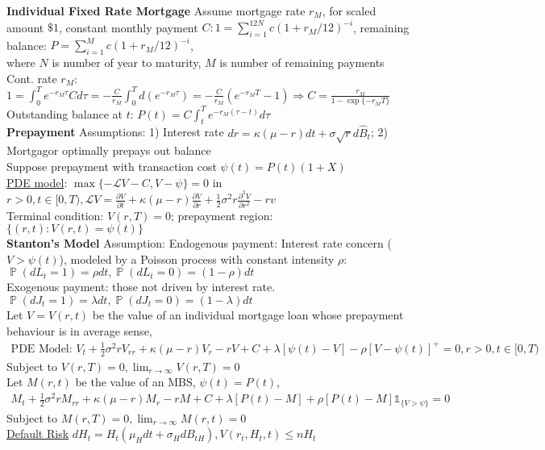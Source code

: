 \documentclass[12pt,landscape, a4paper]{article}
\theoremstyle{remark}
\newcommand{\prob}{\operatorname{\mathbb{P}}}
\newcommand{\dd}{\partial}
\begin{document}
\begin{multicols*}{3}
\textbf{Individual Fixed Rate Mortgage} Assume mortgage rate $r_M$, for scaled amount $\$1$, constant monthly payment $C: 1 = \sum^{12N}_{i=1} c (1+ r_M/12)^{-i}$, remaining balance: $P = \sum^M_{i=1} c (1+ r_M/12)^{-i}$, \\
where $N$ is number of year to maturity, $M$ is number of remaining payments\\
Cont. rate $r_M$: $1 = \int^T_0 e^{-r_M \tau} C d\tau = -\frac{C}{r_M} \int^T_0 d(e^{-r_M \tau}) = -\frac{C}{r_M} \left(e^{-r_M T}-1 \right) \Rightarrow C = \frac{r_M}{1 - \exp \{ -r_M T\}}$\\
Outstanding balance at $t$: $P(t) = C \int^T_t e^{-r_M (\tau - t)} d\tau$\\

\textbf{Prepayment} Assumptions: 1) Interest rate $dr = \kappa (\mu - r) dt + \sigma \sqrt{r} d \hat{B}_t$; 2) Mortgagor optimally prepays out balance\\
Suppose prepayment with transaction cost $\psi (t) = P(t) (1+X)$\\
\underline{PDE model}: $\max \{-\mathcal{L}V - C, V -\psi \} = 0$ in $r >0, t \in[0, T), \mathcal{L}V = \frac{\dd V}{\dd t} + \kappa (\mu - r)\frac{\dd V}{\dd r} + \frac{1}{2} \sigma^2 r \frac{\dd^2 V}{\dd r^2} - rv$\\
Terminal condition: $V(r, T) = 0$; prepayment region: $\{(r, t): V(r, t) = \psi (t) \}$\\

\textbf{Stanton's Model} Assumption: Endogenous payment: Interest rate concern ($V > \psi (t)$), modeled by a Poisson process with constant intensity $\rho$: $\prob(d L_t = 1) = \rho dt, \prob(d L_t = 0) = (1-\rho) dt$\\
Exogenous payment: those not driven by interest rate. $\prob (d J_t = 1) = \lambda dt, \prob (d J_t = 0) = (1-\lambda) dt$\\
Let $V = V(r, t)$ be the value of an individual mortgage loan whose prepayment behaviour is in average sense,
\begin{align*}
    \text{PDE Model: }V_t + \frac{1}{2} \sigma^2 r V_{rr} + \kappa (\mu - r) V_r - rV + C + \lambda [\psi (t) - V] - \rho [V - \psi (t)]^+ = 0, r>0, t\in [0, T) 
\end{align*}
Subject to $V(r, T) = 0, \lim_{r\to \infty} V(r, T) = 0$\\
Let $M(r, t)$ be the value of an MBS, $\psi (t) = P(t)$,
\begin{align*}
    M_t + \frac{1}{2} \sigma^2 rM_{rr} + \kappa (\mu - r) M_r - rM + C + \lambda [P(t) - M]+ \rho [P(t) - M]\mathds{1}_{\{V>\psi\}} = 0
\end{align*}
Subject to $M(r, T) = 0, \lim_{r \to \infty} M(r, t) = 0$\\
\underline{Default Risk} $d H_t = H_t (\mu_H dt + \sigma_H d B_{tH}), V(r_t, H_t, t)\leq nH_t$\\


\end{multicols*}
\end{document}
